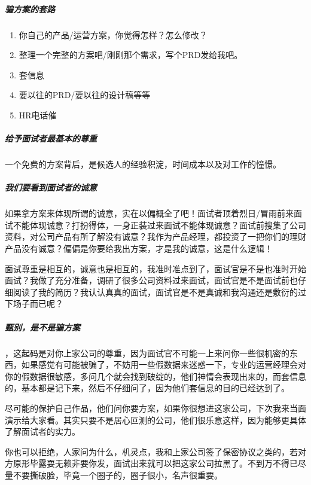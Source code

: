\documentclass[letterpaper,10pt,english]{sphinxmanual}
\begin{document}
\subparagraph{骗方案的套路}
\label{\detokenize{chapter_interview/interviewer:id8}}\begin{enumerate}
%
\item {} 
你自己的产品/运营方案，你觉得怎样？怎么修改？

\item {} 
整理一个完整的方案吧/刚刚那个需求，写个PRD发给我吧。

\item {} 
套信息

\item {} 
要以往的PRD/要以往的设计稿等等

\item {} 
HR电话催

\end{enumerate}


\subparagraph{给予面试者最基本的尊重}
\label{\detokenize{chapter_interview/interviewer:id9}}
一个免费的方案背后，是候选人的经验积淀，时间成本以及对工作的憧憬。


\subparagraph{我们要看到面试者的诚意}
\label{\detokenize{chapter_interview/interviewer:id10}}
如果拿方案来体现所谓的诚意，实在以偏概全了吧！面试者顶着烈日/冒雨前来面试不能体现诚意？打扮得体，一身正装过来面试不能体现诚意？面试前搜集了公司资料，对公司产品有所了解没有诚意？我作为产品经理，都投资了一把你们的理财产品没有诚意？偏偏是你要给我出方案，才是我的诚意，这是什么逻辑！

面试尊重是相互的，诚意也是相互的，我准时准点到了，面试官是不是也准时开始面试？我做了充分准备，调研了很多公司资料过来面试，面试官是不是面试前也仔细阅读了我的简历？我认认真真的面试，面试官是不是真诚和我沟通还是敷衍的过下场子而已呢？


\subparagraph{甄别，是不是骗方案}
\label{\detokenize{chapter_interview/interviewer:id11}}
，这起码是对你上家公司的尊重，因为面试官不可能一上来问你一些很机密的东西，如果感觉有可能被骗了，不妨用一些假数据来迷惑一下，专业的运营经理会对你的假数据很敏感，多问几个就会找到破绽的，他们神情会表现出来的，而套信息的，基本都是记下来，然后不仔细问了，因为他们套信息的目的已经达到了。

尽可能的保护自己作品，他们问你要方案，如果你很想进这家公司，下次我来当面演示给大家看。其实只要不是居心叵测的公司，他们很乐意这样，因为能够更具体了解面试者的实力。

你也可以拒绝，人家问为什么，机灵点，我和上家公司签了保密协议之类的，若对方原形毕露耍无赖非要你发，面试出来就可以把这家公司拉黑了。不到万不得已尽量不要撕破脸，毕竟一个圈子的，圈子很小，名声很重要。
\end{document}
